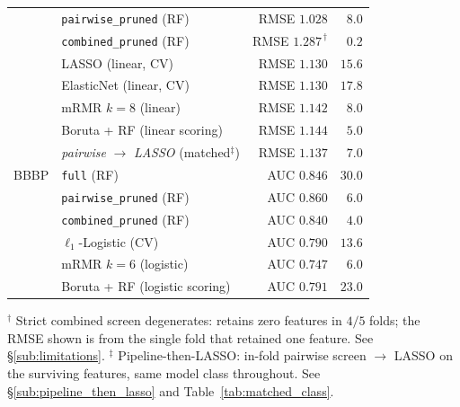 \documentclass[STIX1COL]{WileyNJDv5}
\theoremstyle{definition}
\begin{document}
\begin{table}[h]
\begin{tabular}{llrr}
              & \texttt{pairwise\_pruned} (RF) & RMSE $1.028$ & $\phantom{0}8.0$\\
              & \texttt{combined\_pruned} (RF) & RMSE $1.287^{\,\dagger}$ & $\phantom{0}0.2$\\
              & LASSO (linear, CV)        & RMSE $1.130$ & $15.6$\\
              & ElasticNet (linear, CV)   & RMSE $1.130$ & $17.8$\\
              & mRMR $k{=}8$ (linear)     & RMSE $1.142$ & $\phantom{0}8.0$\\
              & Boruta + RF (linear scoring) & RMSE $1.144$ & $\phantom{0}5.0$\\
              & \emph{pairwise} $\to$ \emph{LASSO} (matched$^{\ddagger}$) & RMSE $1.137$ & $\phantom{0}7.0$\\
\midrule
BBBP & \texttt{full} (RF)                 & AUC $0.846$ & $30.0$\\
     & \texttt{pairwise\_pruned} (RF)     & AUC $0.860$ & $\phantom{0}6.0$\\
     & \texttt{combined\_pruned} (RF)     & AUC $0.840$ & $\phantom{0}4.0$\\
     & $\ell_1$-Logistic (CV)             & AUC $0.790$ & $13.6$\\
     & mRMR $k{=}6$ (logistic)            & AUC $0.747$ & $\phantom{0}6.0$\\
     & Boruta + RF (logistic scoring)     & AUC $0.791$ & $23.0$\\
\bottomrule
\end{tabular}

\vspace{0.5em}
\noindent\small{$^\dagger$ Strict combined screen degenerates: retains zero features in $4/5$ folds; the RMSE shown is from the single fold that retained one feature. See \S\ref{sub:limitations}.}
\noindent\small{$^\ddagger$ Pipeline-then-LASSO: in-fold pairwise screen $\to$ LASSO on the surviving features, same model class throughout. See \S\ref{sub:pipeline_then_lasso} and Table~\ref{tab:matched_class}.}
\end{table}
\end{document}
